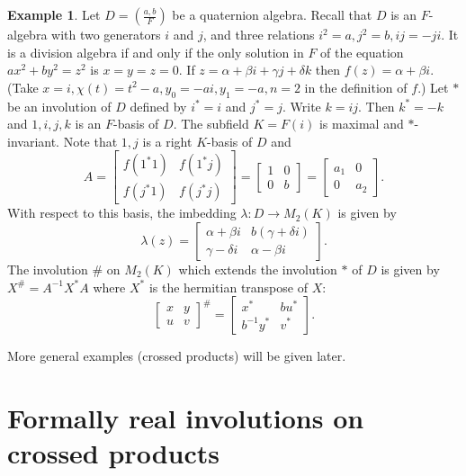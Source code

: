 \documentclass[12pt,reqno]{amsart}
\theoremstyle{definition}
\newtheorem{ex}{Example}
\begin{document}
\begin{ex}
Let $D = \left( \frac{a, b}{F} \right)$ be a quaternion algebra. Recall that $D$
is an $F$-algebra with two generators $i$ and $j$, and three relations $i^2=a,j^2=b,ij=-ji$.
It is a division algebra if and only if the only solution in $F$ 
of the equation $ax^2+by^2=z^2$ is $x=y=z=0$.
If $z = \alpha+\beta i+\gamma j+\delta k$ then $f(z)=\alpha+\beta i$.
(Take $x=i,\chi(t)=t^2-a,y_0=-ai,y_1=-a,n=2$ in the definition of $f$.)
Let $\ast$ be an involution of $D$ defined by $i^\ast=i$ and $j^\ast=j$.
Write $k = ij$. Then $k^\ast=-k$ and $1,i,j,k$ is an $F$-basis of $D$.
The subfield $K=F(i)$ is maximal and $\ast$-invariant.
Note that $1,j$ is a right $K$-basis of $D$ and 
\[
A = \left[ \begin{array}{cc}f(1^\ast  1) & f(1^\ast  j) \\ f(j^\ast  1) & f(j^\ast  j)\end{array} \right]
= \left[ \begin{array}{cc} 1 & 0 \\ 0 & b \end{array} \right] 
= \left[ \begin{array}{cc} a_1 & 0 \\ 0 & a_2 \end{array} \right].
\]
With respect to this basis, the imbedding $\lambda \colon D \to M_2(K)$ is given by
\[
\lambda(z)=\left[ \begin{array}{cc} \alpha+\beta i & b(\gamma+\delta i) \\ 
\gamma - \delta i& \alpha-\beta i \end{array} \right].
\]
The involution $\#$ on $M_2(K)$ which extends the involution $\ast$ of $D$ is given by 
$X^\# = A^{-1} X^\ast A$ where $X^\ast$ is the hermitian transpose of $X$:
\[
\left[ \begin{array}{cc}
x & y \\ u & v 
\end{array} \right]^\# =
\left[ \begin{array}{cc}
x^\ast & b u^\ast \\ b^{-1} y^\ast & v^\ast 
\end{array} \right].
\]
\end{ex}

More general examples (crossed products) will be given later.



\section{Formally real involutions on crossed products}
\label{crossed}
\end{document}
